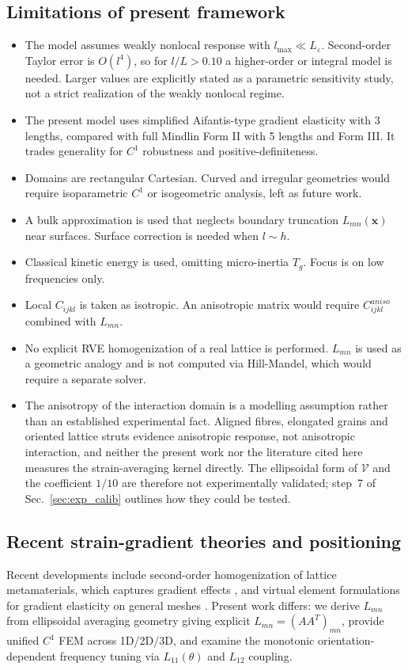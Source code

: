 \documentclass[final,3p,times,fleqn]{elsarticle}
\newcommand{\revtwo}[1]{\textcolor{revtwocolor}{#1}}
\begin{document}
\subsection{Limitations of present framework}
\begin{itemize}
  \item The model assumes weakly nonlocal response with $l_{\max}\ll L_\varepsilon$. Second-order Taylor error is $O(l^4)$, so for $l/L>0.10$ a higher-order or integral model is needed. Larger values are explicitly stated as a parametric sensitivity study, not a strict realization of the weakly nonlocal regime.
  \item The present model uses simplified Aifantis-type gradient elasticity with 3 lengths, compared with full Mindlin Form II with 5 lengths and Form III. It trades generality for $C^1$ robustness and positive-definiteness.
  \item Domains are rectangular Cartesian. Curved and irregular geometries would require isoparametric $C^1$ or isogeometric analysis, left as future work.
  \item A bulk approximation is used that neglects boundary truncation $L_{mn}(\mathbf{x})$ near surfaces. Surface correction is needed when $l\sim h$.
  \item Classical kinetic energy is used, omitting micro-inertia $T_g$. Focus is on low frequencies only.
  \item Local $C_{ijkl}$ is taken as isotropic. An anisotropic matrix would require $C^{aniso}_{ijkl}$ combined with $L_{mn}$.
  \item No explicit RVE homogenization of a real lattice is performed. $L_{mn}$ is used as a geometric analogy and is not computed via Hill-Mandel, which would require a separate solver.

  \item \revtwo{The anisotropy of the interaction domain is a modelling
  assumption rather than an established experimental fact. Aligned fibres,
  elongated grains and oriented lattice struts evidence anisotropic
  response, not anisotropic interaction, and neither the present work nor
  the literature cited here measures the strain-averaging kernel directly.
  The ellipsoidal form of $\mathcal{V}$ and the coefficient $1/10$ are
  therefore not experimentally validated; step~7 of
  Sec.~\ref{sec:exp_calib} outlines how they could be tested.}
\end{itemize}

\subsection{Recent strain-gradient theories and positioning}
\revtwo{Recent developments include second-order homogenization of lattice metamaterials, which captures gradient effects \cite{Molavitabrizi2023}, and virtual element formulations for gradient elasticity on general meshes \cite{WriggersHudobivnik2023}. }Present work differs: we derive $L_{mn}$ from ellipsoidal averaging geometry giving explicit $L_{mn}=(AA^T)_{mn}$, provide unified $C^1$ FEM across 1D/2D/3D, and examine the monotonic orientation-dependent frequency tuning via $L_{11}(\theta)$ and $L_{12}$ coupling.
\end{document}
